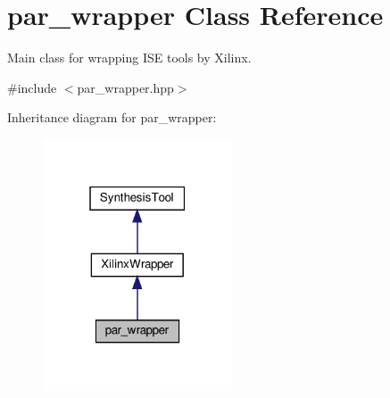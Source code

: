 \hypertarget{classpar__wrapper}{}\section{par\+\_\+wrapper Class Reference}
\label{classpar__wrapper}


Main class for wrapping I\+SE tools by Xilinx.  




{\ttfamily \#include $<$par\+\_\+wrapper.\+hpp$>$}



Inheritance diagram for par\+\_\+wrapper\+:
\nopagebreak
\begin{figure}[H]
\begin{center}
\leavevmode
\includegraphics[width=159pt]{de/de5/classpar__wrapper__inherit__graph}
\end{center}
\end{figure}


